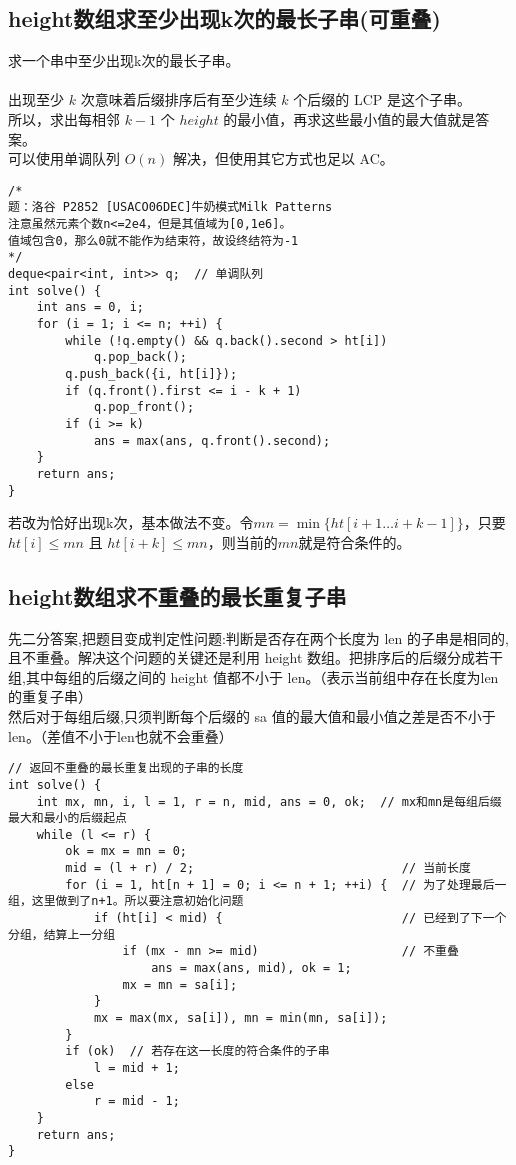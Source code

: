     \subsection{height数组求至少出现k次的最长子串(可重叠)}
        求一个串中至少出现k次的最长子串。\\\\
        出现至少 $k$ 次意味着后缀排序后有至少连续 $k$ 个后缀的 LCP 是这个子串。\\
        所以，求出每相邻 $k-1$ 个 $height$ 的最小值，再求这些最小值的最大值就是答案。\\
        可以使用单调队列 $O(n)$ 解决，但使用其它方式也足以 AC。
\begin{lstlisting}
/*
题：洛谷 P2852 [USACO06DEC]牛奶模式Milk Patterns
注意虽然元素个数n<=2e4，但是其值域为[0,1e6]。
值域包含0，那么0就不能作为结束符，故设终结符为-1
*/
deque<pair<int, int>> q;  // 单调队列
int solve() {
    int ans = 0, i;
    for (i = 1; i <= n; ++i) {
        while (!q.empty() && q.back().second > ht[i])
            q.pop_back();
        q.push_back({i, ht[i]});
        if (q.front().first <= i - k + 1)
            q.pop_front();
        if (i >= k)
            ans = max(ans, q.front().second);
    }
    return ans;
}
\end{lstlisting}
        若改为恰好出现k次，基本做法不变。令$mn=\min\{ht[i+1\dots i+k-1]\}$，只要$ht[i]\le mn$ 且 $ht[i+k]\le mn$，则当前的$mn$就是符合条件的。
    \subsection{height数组求不重叠的最长重复子串}
        先二分答案,把题目变成判定性问题:判断是否存在两个长度为 len 的子串是相同的,且不重叠。解决这个问题的关键还是利用
        height 数组。把排序后的后缀分成若干组,其中每组的后缀之间的 height 值都不小于 len。（表示当前组中存在长度为len的重复子串）\\
        然后对于每组后缀,只须判断每个后缀的 sa 值的最大值和最小值之差是否不小于 len。（差值不小于len也就不会重叠）
\begin{lstlisting}
// 返回不重叠的最长重复出现的子串的长度
int solve() {
    int mx, mn, i, l = 1, r = n, mid, ans = 0, ok;  // mx和mn是每组后缀最大和最小的后缀起点
    while (l <= r) {
        ok = mx = mn = 0;
        mid = (l + r) / 2;                             // 当前长度
        for (i = 1, ht[n + 1] = 0; i <= n + 1; ++i) {  // 为了处理最后一组，这里做到了n+1。所以要注意初始化问题
            if (ht[i] < mid) {                         // 已经到了下一个分组，结算上一分组
                if (mx - mn >= mid)                    // 不重叠
                    ans = max(ans, mid), ok = 1;
                mx = mn = sa[i];
            }
            mx = max(mx, sa[i]), mn = min(mn, sa[i]);
        }
        if (ok)  // 若存在这一长度的符合条件的子串
            l = mid + 1;
        else
            r = mid - 1;
    }
    return ans;
}
\end{lstlisting}
